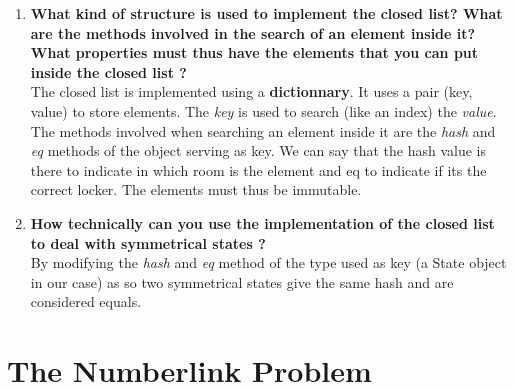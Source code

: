 \documentclass[10pt,a4paper]{article}
\begin{document}
\begin{enumerate}
	\item \textbf{What kind of structure is used to implement the closed list? What are the methods involved in the search of an element inside it? What properties must thus have the elements that you can put inside the closed list ?} \\
	
	The closed list is implemented using a \textbf{dictionnary}. It uses a pair (key, value) to store elements. The \textit{key} is used to search (like an index) the \textit{value}. \\
	
	The methods involved when searching an element inside it are the \textit{hash} and \textit{eq} methods of the object serving as key. We can say that the hash value is there to indicate in which room is the element and eq to indicate if its the correct locker. The elements must thus be immutable.
	
	\item \textbf{How technically can you use the implementation of the closed list to deal with symmetrical states ? }\\
	
	By modifying the \textit{hash} and \textit{eq} method of the type used as key (a State object in our case) as so two symmetrical states give the same hash and are considered equals.
		
\end{enumerate}

\section{The Numberlink Problem}
\end{document}
